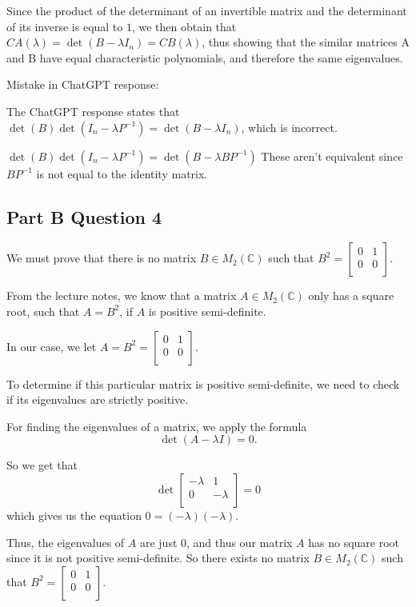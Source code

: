 \documentclass{article}
\begin{document}
Since the product of the determinant of an invertible matrix and the determinant of its inverse is equal to $1$, we then obtain that $CA(\lambda )= \det(B- \lambda I_n)= CB(\lambda )$, thus showing that the similar matrices A and B have equal characteristic polynomials, and therefore the same eigenvalues.


Mistake in ChatGPT response:

The ChatGPT response states that $\det(B)\det(I_n-\lambda P^{-1})=\det(B-\lambda I_n)$, which is incorrect. 

$\det(B) \det(I_n-\lambda P^{-1}) = \det(B-\lambda BP^{-1})$ 
These aren’t equivalent since $BP^{-1}$ is not equal to the identity matrix.


\subsection{Part B Question 4}
We must prove that there is no matrix \(B \in M_2(\mathbb{C})\) 
such that \(B^2 = 
\begin{bmatrix}
    0 & 1 \\
    0 & 0 \\
\end{bmatrix}\).

From the lecture notes, we know that a matrix \(A \in M_2(\mathbb{C})\) 
only has a square root, such that \(A = B^2\), if \(A\) is positive semi-definite.

In our case, we let \(A = B^2 = 
\begin{bmatrix}
    0 & 1 \\
    0 & 0 \\
\end{bmatrix}\).

To determine if this particular matrix is positive semi-definite, we need to check if its eigenvalues are strictly positive.

For finding the eigenvalues of a matrix, we apply the formula 
\[
\det(A - \lambda I) = 0.
\]

So we get that
\[
\det
\begin{bmatrix}
    -\lambda & 1 \\
    0 & -\lambda \\
\end{bmatrix}
= 0
\]
which gives us the equation \(0 = (-\lambda)(-\lambda)\).


Thus, the eigenvalues of \(A\) are just 0, and thus our matrix \(A\) has no square root since it is not positive semi-definite.
So there exists no matrix \(B \in M_2(\mathbb{C})\) 
such that \(B^2 = 
\begin{bmatrix}
    0 & 1 \\
    0 & 0 \\
\end{bmatrix}\).
\end{document}
